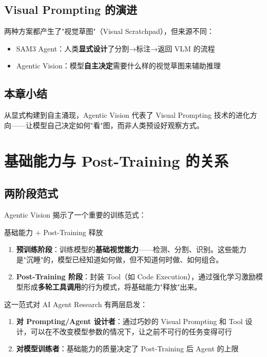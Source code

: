 \documentclass[a4paper]{article}
\begin{document}
\subsection{Visual Prompting 的演进}

两种方案都产生了"视觉草图"（Visual Scratchpad），但来源不同：

\begin{itemize}
    \item SAM3 Agent：人类\textbf{显式设计}了分割→标注→返回 VLM 的流程
    \item Agentic Vision：模型\textbf{自主决定}需要什么样的视觉草图来辅助推理
\end{itemize}

\subsection{本章小结}

从显式构建到自主涌现，Agentic Vision 代表了 Visual Prompting 技术的进化方向——让模型自己决定如何"看"图，而非人类预设好观察方式。


\section{基础能力与 Post-Training 的关系}

\subsection{两阶段范式}

Agentic Vision 揭示了一个重要的训练范式：

\begin{importantbox}{基础能力 + Post-Training 释放}
\begin{enumerate}
    \item \textbf{预训练阶段}：训练模型的\textbf{基础视觉能力}——检测、分割、识别。这些能力是"沉睡"的，模型已经知道如何做，但不知道何时做、如何组合。
    \item \textbf{Post-Training 阶段}：封装 Tool（如 Code Execution），通过强化学习激励模型形成\textbf{多轮工具调用}的行为模式，将基础能力"释放"出来。
\end{enumerate}
\end{importantbox}

这一范式对 AI Agent Research 有两层启发：

\begin{enumerate}
    \item \textbf{对 Prompting/Agent 设计者}：通过巧妙的 Visual Prompting 和 Tool 设计，可以在不改变模型参数的情况下，让之前不可行的任务变得可行
    \item \textbf{对模型训练者}：基础能力的质量决定了 Post-Training 后 Agent 的上限
\end{enumerate}
\end{document}
